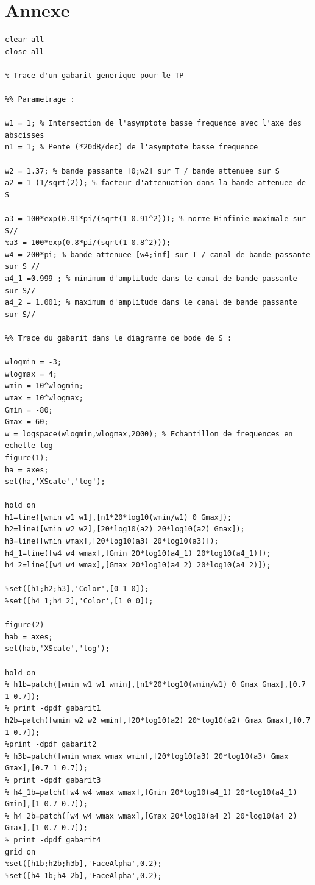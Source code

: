 \documentclass[12pt, a4paper, openany]{report}
\begin{document}
\chapter*{Annexe}
\begin{verbatim}
clear all
close all

% Trace d'un gabarit generique pour le TP

%% Parametrage :

w1 = 1; % Intersection de l'asymptote basse frequence avec l'axe des abscisses
n1 = 1; % Pente (*20dB/dec) de l'asymptote basse frequence

w2 = 1.37; % bande passante [0;w2] sur T / bande attenuee sur S
a2 = 1-(1/sqrt(2)); % facteur d'attenuation dans la bande attenuee de S

a3 = 100*exp(0.91*pi/(sqrt(1-0.91^2))); % norme Hinfinie maximale sur S//
%a3 = 100*exp(0.8*pi/(sqrt(1-0.8^2)));
w4 = 200*pi; % bande attenuee [w4;inf] sur T / canal de bande passante sur S //
a4_1 =0.999 ; % minimum d'amplitude dans le canal de bande passante sur S//
a4_2 = 1.001; % maximum d'amplitude dans le canal de bande passante sur S//

%% Trace du gabarit dans le diagramme de bode de S :

wlogmin = -3;
wlogmax = 4;
wmin = 10^wlogmin;
wmax = 10^wlogmax;
Gmin = -80;
Gmax = 60;
w = logspace(wlogmin,wlogmax,2000); % Echantillon de frequences en echelle log
figure(1);
ha = axes;
set(ha,'XScale','log');

hold on
h1=line([wmin w1 w1],[n1*20*log10(wmin/w1) 0 Gmax]);
h2=line([wmin w2 w2],[20*log10(a2) 20*log10(a2) Gmax]);
h3=line([wmin wmax],[20*log10(a3) 20*log10(a3)]);
h4_1=line([w4 w4 wmax],[Gmin 20*log10(a4_1) 20*log10(a4_1)]);
h4_2=line([w4 w4 wmax],[Gmax 20*log10(a4_2) 20*log10(a4_2)]);

%set([h1;h2;h3],'Color',[0 1 0]);
%set([h4_1;h4_2],'Color',[1 0 0]);

figure(2)
hab = axes;
set(hab,'XScale','log');

hold on
% h1b=patch([wmin w1 w1 wmin],[n1*20*log10(wmin/w1) 0 Gmax Gmax],[0.7 1 0.7]);
% print -dpdf gabarit1
h2b=patch([wmin w2 w2 wmin],[20*log10(a2) 20*log10(a2) Gmax Gmax],[0.7 1 0.7]);
%print -dpdf gabarit2
% h3b=patch([wmin wmax wmax wmin],[20*log10(a3) 20*log10(a3) Gmax Gmax],[0.7 1 0.7]);
% print -dpdf gabarit3
% h4_1b=patch([w4 w4 wmax wmax],[Gmin 20*log10(a4_1) 20*log10(a4_1) Gmin],[1 0.7 0.7]);
% h4_2b=patch([w4 w4 wmax wmax],[Gmax 20*log10(a4_2) 20*log10(a4_2) Gmax],[1 0.7 0.7]);
% print -dpdf gabarit4
grid on
%set([h1b;h2b;h3b],'FaceAlpha',0.2);
%set([h4_1b;h4_2b],'FaceAlpha',0.2);


\end{verbatim}
\end{document}
